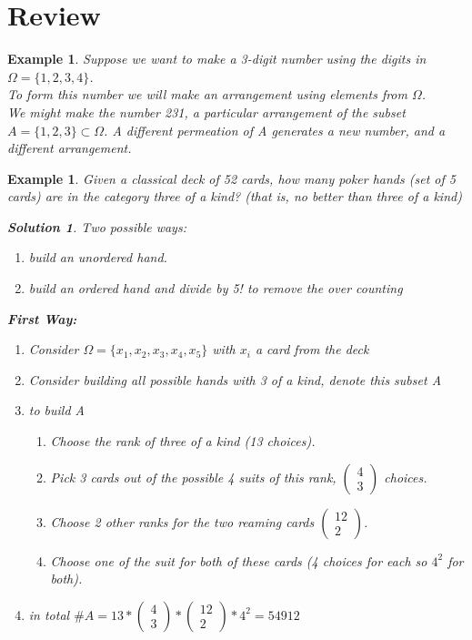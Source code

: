 \documentclass[a4paper]{article}
\newcounter{counter}
\numberwithin{counter}{subsection}
\theoremstyle{break}
\newtheorem{exmp}[counter]{Example}
\begin{document}
\section{Review}%
\label{sec:review}

\begin{exmp}
	Suppose we want to make a 3-digit number using the digits in $\Omega = \{1,2,3,4\}$. \\
	To form this number we will make an arrangement using elements from $\Omega$. \\
	We might make the number 231, a particular arrangement of the subset $A = \{1,2,3\} \subset \Omega$. A different permeation of A generates a new number, and a different arrangement. 
\end{exmp}

\newtheorem{sol}{Solution}
\begin{exmp}
	Given a classical deck of 52 cards, how many poker hands (set of 5 cards) are in the category three of a kind? (that is, no better than three of a kind)

	\begin{sol}
		Two possible ways:
		\begin{enumerate}
			\item build an unordered hand.
			\item build an ordered hand and divide by 5! to remove the over counting
		\end{enumerate}

		\textbf{First Way:} 
		\begin{enumerate}
			\item Consider $\Omega = \{x_1, x_2, x_3, x_4, x_5\}$ with $x_i$ a card from the deck
			\item Consider building all possible hands with 3 of a kind, denote this subset A
			\item to build A
				\begin{enumerate}
					\item Choose the rank of three of a kind (13 choices).
					\item Pick 3 cards out of the possible 4 suits of this rank, $\begin{pmatrix} 4 \\ 3 \end{pmatrix}$ choices.
					\item Choose 2 other ranks for the two reaming cards $\begin{pmatrix} 12 \\ 2 \end{pmatrix}$.
					\item Choose one of the suit for both of these cards (4 choices for each so $4^2$ for both).
				\end{enumerate}
			\item in total $\#A = 13 * \begin{pmatrix} 4 \\ 3 \end{pmatrix}* \begin{pmatrix} 12 \\ 2 \end{pmatrix} * 4^2 = 54912$
		\end{enumerate}


\end{sol}
\end{exmp}
\end{document}
